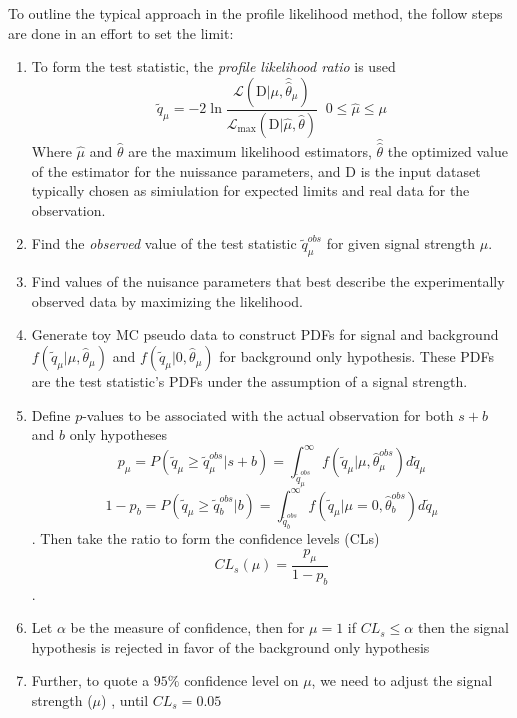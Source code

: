 To outline the typical approach in the profile likelihood method, the follow steps are done in an effort to set the limit:
\begin{enumerate}
\item {To form the test statistic, the \textit{profile likelihood ratio} is used 
  \begin{equation}\tilde{q}_\mu = -2 \ln \frac{\mathcal{L}(\text{D}|\mu,\hat{\hat{\theta}}_\mu)}{\mathcal{L}_\text{max}(\text{D}|\hat{\mu},\hat{\theta})} \;\; 0\leq \hat{\mu} \leq \mu \end{equation}
  Where $\hat{\mu}$ and $\hat{\theta}$ are the maximum likelihood estimators, $\hat{\hat{\theta}}$ the optimized value of the estimator for the nuissance parameters, and D is the input dataset typically chosen as simiulation for expected limits and real data for the observation.
  }
  \item Find the \textit{observed} value of the test statistic $\tilde{q}_\mu^{obs}$ for given signal strength $\mu$.
  \item Find values of the nuisance parameters that best describe the experimentally observed data by maximizing the likelihood.
  \item Generate toy MC pseudo data to construct PDFs for signal and background $f(\tilde{q}_\mu|\mu,\hat{\theta}_\mu)$ and $f(\tilde{q}_\mu|0,\hat{\theta}_\mu)$ for background only hypothesis. These PDFs are the test statistic's PDFs under the assumption of a signal strength.
  \item {Define $p$-values to be associated with the actual observation for both $s+b$ and $b$ only hypotheses
  \begin{equation} p_\mu = P(\tilde{q}_\mu \ge \tilde{q}_\mu^{obs}| s+b) = \int_{\tilde{q}_\mu^{obs}}^\infty f(\tilde{q}_\mu |\mu,\hat{\theta}_\mu^{obs} ) d\tilde{q}_\mu\end{equation}
  \begin{equation} 1- p_b = P(\tilde{q}_\mu \ge \tilde{q}_b^{obs}| b) = \int_{\tilde{q}_b^{obs}}^\infty f(\tilde{q}_\mu |\mu=0,\hat{\theta}_b^{obs} ) d\tilde{q}_\mu\end{equation}.
   Then take the ratio to form the confidence levels (CLs)
  \begin{equation} CL_s (\mu)  = \frac{p_\mu}{1-p_b}\end{equation}.
  }
  \item{ Let $\alpha$ be the measure of confidence, then for $\mu=1$ if $CL_s \leq \alpha$ then the signal hypothesis is rejected in favor of the background only hypothesis}
  \item {Further, to quote a $95\%$ confidence level on $\mu$, we need to adjust the signal strength ($\mu$) , until $CL_s = 0.05$}
\end{enumerate}


